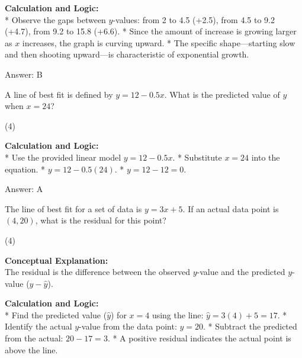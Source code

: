 \documentclass[11pt,paper=a4,answers]{exam}
\begin{document}
\begin{questions}
\begin{solution}
\textbf{Calculation and Logic:} \\
* Observe the gaps between $y$-values: from 2 to 4.5 (+2.5), from 4.5 to 9.2 (+4.7), from 9.2 to 15.8 (+6.6).
* Since the amount of increase is growing larger as $x$ increases, the graph is curving upward.
* The specific shape—starting slow and then shooting upward—is characteristic of exponential growth.

\vspace{30pt}

Answer: \colorbox{yellow!100}{B}
\end{solution}

\vspace{60pt}

\question
A line of best fit is defined by $y = 12 - 0.5x$. What is the predicted value of $y$ when $x = 24$?
\begin{tasks}(4)
\end{tasks}

\begin{solution}
\textbf{Calculation and Logic:} \\
* Use the provided linear model $y = 12 - 0.5x$.
* Substitute $x = 24$ into the equation.
* $y = 12 - 0.5(24)$.
* $y = 12 - 12 = 0$.

\vspace{30pt}

Answer: \colorbox{yellow!100}{A}
\end{solution}

\vspace{60pt}

\question
The line of best fit for a set of data is $y = 3x + 5$. If an actual data point is $(4, 20)$, what is the residual for this point?
\begin{tasks}(4)
\end{tasks}

\begin{solution}
\textbf{Conceptual Explanation:} \\
The residual is the difference between the observed $y$-value and the predicted $y$-value ($y - \hat{y}$).

\vspace{30pt}

\textbf{Calculation and Logic:} \\
* Find the predicted value ($\hat{y}$) for $x = 4$ using the line: $\hat{y} = 3(4) + 5 = 17$.
* Identify the actual $y$-value from the data point: $y = 20$.
* Subtract the predicted from the actual: $20 - 17 = 3$.
* A positive residual indicates the actual point is above the line.


\end{solution}
\end{questions}
\end{document}
